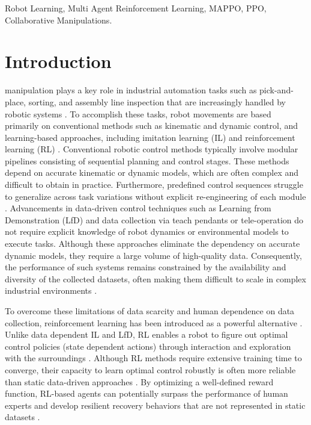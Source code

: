 \documentclass[lettersize,journal]{IEEEtran}
\begin{document}
\begin{IEEEkeywords}
Robot Learning, Multi Agent Reinforcement Learning, MAPPO, PPO, Collaborative Manipulations.
\end{IEEEkeywords}

\section{Introduction}
\label{intro}
 manipulation plays a key role in industrial automation tasks such as pick-and-place, sorting, and assembly line inspection that are increasingly handled by robotic systems \cite{intro-2}. To accomplish these tasks, robot movements are based primarily on conventional methods such as kinematic and dynamic control, and learning-based approaches, including imitation learning (IL) and reinforcement learning (RL) \cite{intro-3}. Conventional robotic control methods typically involve modular pipelines consisting of sequential planning and control stages. These methods depend on accurate kinematic or dynamic models, which are often complex and difficult to obtain in practice. Furthermore, predefined control sequences struggle to generalize across task variations without explicit re-engineering of each module \cite{intro-1}. Advancements in data-driven control techniques such as Learning from Demonstration (LfD) and data collection via teach pendants or tele-operation do not require explicit knowledge of robot dynamics or environmental models to execute tasks. Although these approaches eliminate the dependency on accurate dynamic models, they require a large volume of high-quality data. Consequently, the performance of such systems remains constrained by the availability and diversity of the collected datasets, often making them difficult to scale in complex industrial environments \cite{intro-6}.

To overcome these limitations of data scarcity and human dependence on data collection, reinforcement learning has been introduced as a powerful alternative \cite{intro-8}. Unlike data dependent IL and LfD, RL enables a robot to figure out optimal control policies (state dependent actions) through interaction and exploration with the surroundings \cite{intro-7}. Although RL methods require extensive training time to converge, their capacity to learn optimal control robustly is often more reliable than static data-driven approaches \cite{intro-10}. By optimizing a well-defined reward function, RL-based agents can potentially surpass the performance of human experts and develop resilient recovery behaviors that are not represented in static datasets \cite{intro-9}.
\end{document}
